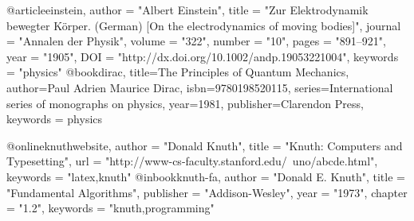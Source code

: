 @article{einstein,
    author =       "Albert Einstein",
    title =        "{Zur Elektrodynamik bewegter K{\"o}rper}. ({German})
    [{On} the electrodynamics of moving bodies]",
    journal =      "Annalen der Physik",
    volume =       "322",
    number =       "10",
    pages =        "891--921",
    year =         "1905",
    DOI =          "http://dx.doi.org/10.1002/andp.19053221004",
    keywords =     "physics"
}
@book{dirac,
    title={The Principles of Quantum Mechanics},
    author={Paul Adrien Maurice Dirac},
    isbn={9780198520115},
    series={International series of monographs on physics},
    year={1981},
    publisher={Clarendon Press},
    keywords = {physics}
}
 
@online{knuthwebsite,
    author    = "Donald Knuth",
    title     = "Knuth: Computers and Typesetting",
    url       = "http://www-cs-faculty.stanford.edu/~uno/abcde.html",
    keywords  = "latex,knuth"
}
@inbook{knuth-fa,
    author = "Donald E. Knuth",
    title = "Fundamental Algorithms",
    publisher = "Addison-Wesley",
    year = "1973",
    chapter = "1.2",
    keywords  = "knuth,programming"
}